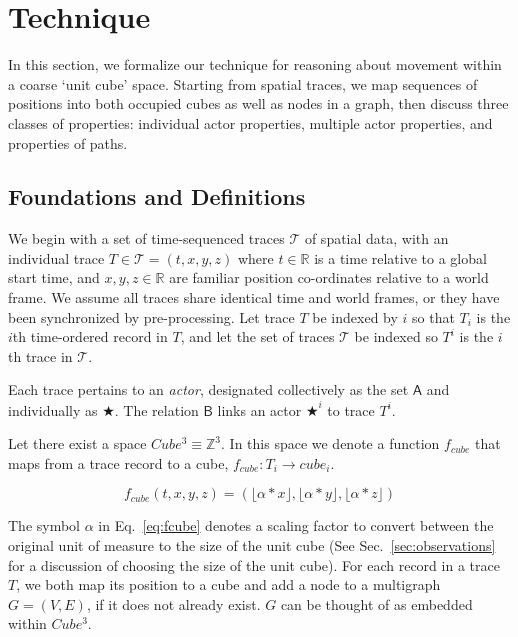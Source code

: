 \section{Technique}
\label{sec:technique}

In this section, we formalize our technique for reasoning about movement within a coarse `unit cube' space.
Starting from spatial traces, we map sequences of positions into both occupied cubes as well as nodes in a graph, then discuss three classes of properties: individual actor properties, multiple actor properties, and properties of paths.

\subsection{Foundations and Definitions}
We begin with a set of time-sequenced traces $\mathcal{T}$ of spatial data, with an individual trace $T\in\mathcal{T} = (t,x,y,z)$ where $t\in\mathbb{R}$ is a time relative to a global start time, and $x,y,z\in \mathbb{R}$ are familiar position co-ordinates relative to a world frame. 
We assume all traces share identical time and world frames, or they have been synchronized by pre-processing.
Let trace $T$ be indexed by $i$ so that $T_i$ is the $i$th time-ordered record in $T$, and let the set of traces $\mathcal{T}$ be indexed so $T^i$ is the $i$th trace in $\mathcal{T}$. 

Each trace pertains to an \emph{actor}, designated collectively as the set $\mathsf{A}$ and individually as $\bigstar$. 
The relation $\mathsf{B}$ links an actor $\bigstar^i$ to trace $T^i$.


Let there exist a space $Cube^3 \equiv \mathbb{Z}^3$.  In this space we denote a function $f_{cube}$ that maps from a trace record to a cube, $f_{cube} : T_i \rightarrow cube_i$. 


\begin{equation}
f_{cube}(t,x,y,z) = (\lfloor \alpha * x \rfloor, \lfloor \alpha * y \rfloor , \lfloor \alpha * z \rfloor )
\label{eq:fcube}
\end{equation}

The symbol $\alpha$ in Eq.~\ref{eq:fcube} denotes a scaling factor to convert between the original unit of measure to the size of the unit cube (See Sec.~\ref{sec:observations} for a discussion of choosing the size of the unit cube).
For each record in a trace $T$, we both map its position to a cube and add a node to a multigraph $G = (V,E)$, if it does not already exist. $G$ can be thought of as embedded within $Cube^3$.

